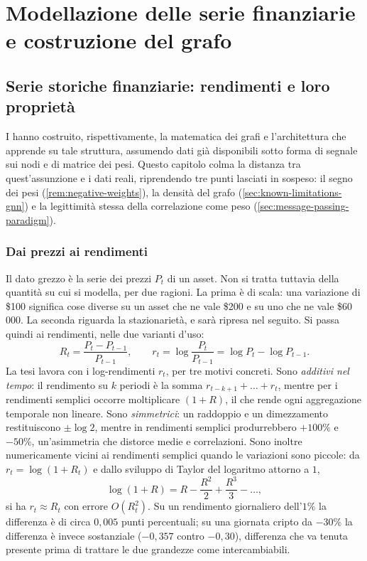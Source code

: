 \chapter{Modellazione delle serie finanziarie e costruzione del grafo}
\label{ch:financial-series-and-graph-construction}

\section{Serie storiche finanziarie: rendimenti e loro proprietà}
\label{sec:financial-time-series-returns}

I  hanno costruito, rispettivamente, la matematica dei grafi e l'architettura che apprende su tale struttura, assumendo dati già disponibili sotto forma di segnale sui nodi e di matrice dei pesi. Questo capitolo colma la distanza tra quest'assunzione e i dati reali, riprendendo tre punti lasciati in sospeso: il segno dei pesi (\cref{rem:negative-weights}), la densità del grafo (\cref{sec:known-limitations-gnn}) e la legittimità stessa della correlazione come peso (\cref{sec:message-passing-paradigm}).

\subsection{Dai prezzi ai rendimenti}

Il dato grezzo è la serie dei prezzi $P_t$ di un asset. Non si tratta tuttavia della quantità su cui si modella, per due ragioni. La prima è di scala: una variazione di \$100 significa cose diverse su un asset che ne vale \$200 e su uno che ne vale \$60\,000. La seconda riguarda la stazionarietà, e sarà ripresa nel seguito. Si passa quindi ai rendimenti, nelle due varianti d'uso:
\begin{equation}
\label{eq:returns}
R_t = \frac{P_t - P_{t-1}}{P_{t-1}}, \qquad r_t = \log\frac{P_t}{P_{t-1}} = \log P_t - \log P_{t-1}.
\end{equation}
La tesi lavora con i log-rendimenti $r_t$, per tre motivi concreti. Sono \emph{additivi nel tempo}: il rendimento su $k$ periodi è la somma $r_{t-k+1}+\dots+r_t$, mentre per i rendimenti semplici occorre moltiplicare $(1+R)$, il che rende ogni aggregazione temporale non lineare. Sono \emph{simmetrici}: un raddoppio e un dimezzamento restituiscono $\pm\log 2$, mentre in rendimenti semplici produrrebbero $+100\%$ e $-50\%$, un'asimmetria che distorce medie e correlazioni. Sono inoltre numericamente vicini ai rendimenti semplici quando le variazioni sono piccole: da $r_t = \log(1+R_t)$ e dallo sviluppo di Taylor del logaritmo attorno a $1$,
$$\log(1+R) = R - \frac{R^2}{2} + \frac{R^3}{3} - \dots,$$
si ha $r_t\approx R_t$ con errore $O(R_t^2)$. Su un rendimento giornaliero dell'$1\%$ la differenza è di circa $0{,}005$ punti percentuali; su una giornata cripto da $-30\%$ la differenza è invece sostanziale ($-0{,}357$ contro $-0{,}30$), differenza che va tenuta presente prima di trattare le due grandezze come intercambiabili.

